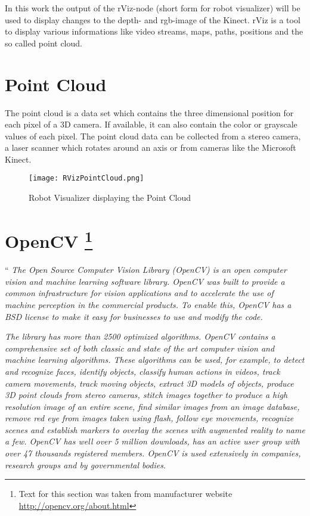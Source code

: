 In this work the output of the rViz-node (short form for robot visualizer) will be used to display changes to the depth- and 
rgb-image of the Kinect. rViz is a tool to display various informations like video streams, maps, paths, positions and the
so called point cloud.
\clearpage

\section{Point Cloud}
The point cloud is a data set which contains the three dimensional position for each pixel of a 3D camera. 
If available, it can also contain the color or grayscale values of each pixel. 
The point cloud data can be collected from a stereo camera, a laser scanner which rotates around an axis or 
from cameras like the Microsoft Kinect.

\begin{figure}[htp]
	\centering
	\texttt{[image: RVizPointCloud.png]}
	\caption{Robot Visualizer displaying the Point Cloud}
	\label{figure:RVizPointCloud.png}
\end{figure}
\clearpage

\section[OpenCV]{OpenCV \footnote{Text for this section was taken from manufacturer website \url{http://opencv.org/about.html}\cite{willowgarage:opencv}}}

``\textit{ 
The Open Source Computer Vision Library (OpenCV) is an open computer vision 
and machine learning software library. OpenCV was built to provide a common 
infrastructure for vision applications and to accelerate the use of machine 
perception in the commercial products. To enable this, OpenCV has a BSD license 
to make it easy for businesses to use and modify the code.
}

\textit{ 
The library has more than 2500 optimized algorithms. 
OpenCV contains a comprehensive set of both classic and state of the art computer
 vision and machine learning algorithms. These algorithms can be used, for example, 
 to detect and recognize faces, identify objects, classify human actions in videos, 
 track camera movements, track moving objects, extract 3D models of objects, produce 
 3D point clouds from stereo cameras, stitch images together to produce a high resolution 
 image of an entire scene, find similar images from an image database, remove red eye from 
 images taken using flash, follow eye movements, recognize scenes and establish markers to 
 overlay the scenes with augmented reality to name a few. OpenCV has well over 5 million downloads, 
 has an active user group with over 47 thousands registered members. OpenCV is used 
 extensively in companies, research groups and by governmental bodies.
}

